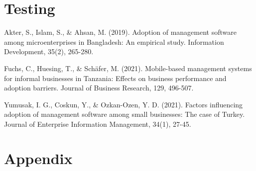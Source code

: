 \documentclass{article}
\begin{document}
\section*{Testing}
\lipsum[1-2]
\newpage



\begin{thebibliography}{10}
	

	Akter, S., Islam, S., \& Ahsan, M. (2019). Adoption of management software among microenterprises in Bangladesh: An empirical study. Information Development, 35(2), 265-280.

	Fuchs, C., Huesing, T., \& Schäfer, M. (2021). Mobile-based management systems for informal businesses in Tanzania: Effects on business performance and adoption barriers. Journal of Business Research, 129, 496-507.

	Yumusak, I. G., Coskun, Y., \& Ozkan-Ozen, Y. D. (2021). Factors influencing adoption of management software among small businesses: The case of Turkey. Journal of Enterprise Information Management, 34(1), 27-45.

\end{thebibliography}


\newpage

\section{Appendix}
\lipsum[1-2]
\newpage
\end{document}
